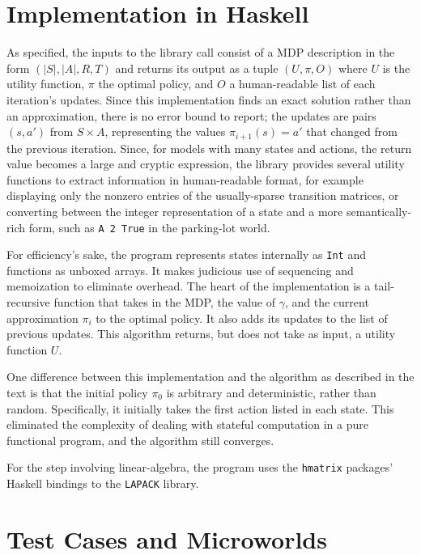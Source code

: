\documentclass[paper=letter,pagesize=automedia,twoside=false,12pt]{scrartcl}
\theoremstyle{plain}%
\theoremstyle{definition}
\theoremstyle{remark}
\newcommand{\abs}[1]{\left\lvert #1 \right\rvert}
\begin{document}
\section{Implementation in Haskell}\label{sec:haskell}

As specified, the inputs to the library call consist of a MDP description in the form \(\left( \abs{S},\abs{A},R,T \right)\) and returns its output as a tuple \(\left( U, \pi, O \right)\) where \(U\) is the utility function, \(\pi\) the optimal policy, and \(O\) a human-readable list of each iteration's updates.  Since this implementation finds an exact solution rather than an approximation, there is no error bound to report; the updates are pairs \((s,a')\) from \(S \times A\), representing the values \( \pi_{i+1}(s) = a' \) that changed from the previous iteration.  Since, for models with many states and actions, the return value becomes a large and cryptic expression, the library provides several utility functions to extract information in human-readable format, for example displaying only the nonzero entries of the usually-sparse transition matrices, or converting between the integer representation of a state and a more semantically-rich form, such as \texttt{A 2 True} in the parking-lot world.

For efficiency's sake, the program represents states internally as \texttt{Int} and functions as unboxed arrays.  It makes judicious use of sequencing and memoization to eliminate overhead.  The heart of the implementation is a tail-recursive function that takes in the MDP, the value of \(\gamma\), and the current approximation \(\pi_i\) to the optimal policy.  It also adds its updates to the list of previous updates.  This algorithm returns, but does not take as input, a utility function \(U\).

One difference between this implementation and the algorithm as described in the text is that the initial policy \(\pi_0\) is arbitrary and deterministic, rather than random.  Specifically, it initially takes the first action listed in each state.  This eliminated the complexity of dealing with stateful computation in a pure functional program, and the algorithm still converges.

For the step involving linear-algebra, the program uses the \texttt{hmatrix} packages' Haskell bindings to the \texttt{LAPACK} library.

\section{Test Cases and Microworlds}\label{sec:testcases}
\end{document}
